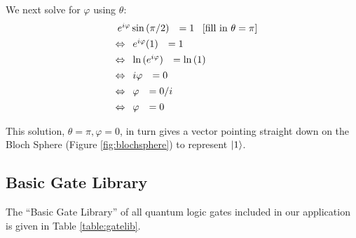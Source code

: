 \documentclass[conference]{IEEEtran}
\begin{document}
\begin{appendices}
We next solve for $\varphi$ using $\theta$:
\begin{multline*}
\begin{split}
\ \ &
\begin{array}{rcrcrc@{\qquad}l}
e^{i\varphi}\sin{(\pi/2)}  &   =  1\\
\end{array}
\text{ [fill in } \theta=\pi \text{]}
\\
& \Leftrightarrow
\begin{array}{rcrcrc@{\qquad}l}
e^{i\varphi}(1)  &   =  1\\
\end{array}
\\
& \Leftrightarrow
\begin{array}{rcrcrc@{\qquad}l}
\ln{(e^{i\varphi})}  &   =  \ln{(1)}\\
\end{array}
\\
& \Leftrightarrow
\begin{array}{rcrcrc@{\qquad}l}
i\varphi  &   =  0\\
\end{array}
\\
& \Leftrightarrow
\begin{array}{rcrcrc@{\qquad}l}
\varphi  &   =  0/i\\
\end{array}
\\
& \Leftrightarrow
\begin{array}{rcrcrc@{\qquad}l}
\varphi  &   =  0\\
\end{array}
\end{split}
\end{multline*}

This solution, $\theta = \pi, \varphi=0$, in turn gives a vector pointing straight down on the Bloch Sphere (Figure \ref{fig:blochsphere}) to represent $\ket{1}$.

\subsection{Basic Gate Library}
\label{appendix:BasicGateLibrary}

The ``Basic Gate Library'' of all quantum logic gates included in our application is given in Table \ref{table:gatelib}.


\end{appendices}
\end{document}
